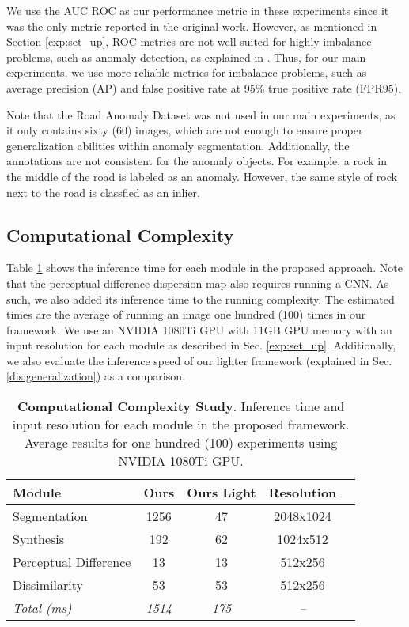 \documentclass[final]{cvpr}
\begin{document}
We use the AUC ROC as our performance metric in these experiments since it was the only metric reported in the original work. However, as mentioned in Section \ref{exp:set_up}, ROC metrics are not well-suited for highly imbalance problems, such as anomaly detection, as explained in \cite{roc}. Thus, for our main experiments, we use more reliable metrics for imbalance problems, such as average precision (AP) and false positive rate at 95\% true positive rate (FPR95). 

Note that the Road Anomaly Dataset was not used in our main experiments, as it only contains sixty (60) images, which are not enough to ensure proper generalization abilities within anomaly segmentation. Additionally, the annotations are not consistent for the anomaly objects. For example, a rock in the middle of the road is labeled as an anomaly. However, the same style of rock next to the road is classfied as an inlier.  


\subsection{Computational Complexity}
\label{app:time}
Table \ref{tab:inference_time} shows the inference time for each module in the proposed approach. Note that the perceptual difference dispersion map also requires running a CNN. As such, we also added its inference time to the running complexity. 
The estimated times are the average of running an image one hundred (100) times in our framework. We use an NVIDIA 1080Ti GPU with 11GB GPU memory with an input resolution for each module as described in Sec. \ref{exp:set_up}. Additionally, we also evaluate the inference speed of our lighter framework (explained in Sec. \ref{dis:generalization}) as a comparison.

\begin{table}[!htp]\centering
\setlength{\tabcolsep}{3.5pt}
\begin{tabular}{lcccc}\toprule
\textbf{Module} &\textbf{Ours} &\textbf{Ours Light} &\textbf{Resolution} \\\midrule
Segmentation &1256 &47 &2048x1024 \\
Synthesis &192 &62 &1024x512 \\
Perceptual Difference &13 &13 &512x256 \\
Dissimilarity &53 &53 &512x256 \\ \midrule
\textit{Total (ms)} &\textit{1514} &\textit{175} &\textit{--}\\
\bottomrule
\end{tabular}
\caption{\textbf{Computational Complexity Study}. Inference time and input resolution for each module in the proposed framework. Average results for one hundred (100) experiments using NVIDIA 1080Ti GPU.}
\label{tab:inference_time}
\end{table}
\end{document}
